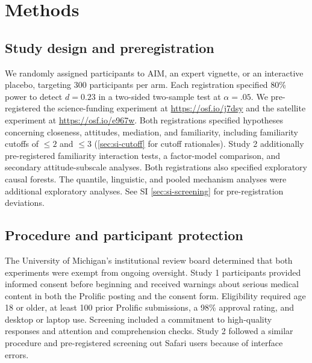 \documentclass[11pt]{article}
\begin{document}
\label{future}
\label{sec:conclusion}



\clearpage
\FloatBarrier
\linespread{1.03}\selectfont
\section{Methods}
\label{sec:methods}




\subsection{Study design and preregistration}
\label{sec:methods-study-design-and-preregistration}

We randomly assigned participants to AIM, an expert vignette, or an interactive placebo, targeting 300 participants per arm. Each registration specified 80\% power to detect $d=0.23$ in a two-sided two-sample test at $\alpha=.05$. We pre-registered the science-funding experiment at \url{https://osf.io/j7dsy} and the satellite experiment at \url{https://osf.io/e967w}. Both registrations specified hypotheses concerning closeness, attitudes, mediation, and familiarity, including familiarity cutoffs of $\leq2$ and $\leq3$ (\autoref{sec:si-cutoff} for cutoff rationales). Study 2 additionally pre-registered familiarity interaction tests, a factor-model comparison, and secondary attitude-subscale analyses. Both registrations also specified exploratory causal forests. The quantile, linguistic, and pooled mechanism analyses were additional exploratory analyses. See SI \ref{sec:si-screening} for pre-registration deviations.

\subsection{Procedure and participant protection}
\label{sec:methods-procedure-and-participant-protection}

The University of Michigan's institutional review board determined that both experiments were exempt from ongoing oversight. Study 1 participants provided informed consent before beginning and received warnings about serious medical content in both the Prolific posting and the consent form. Eligibility required age 18 or older, at least 100 prior Prolific submissions, a 98\% approval rating, and desktop or laptop use. Screening included a commitment to high-quality responses and attention and comprehension checks. Study 2 followed a similar procedure and pre-registered screening out Safari users because of interface errors.
\end{document}

